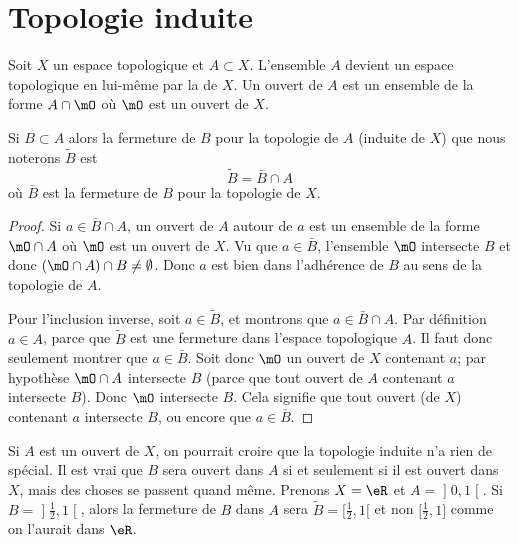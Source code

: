 \section{Topologie induite}

\begin{definition}  \label{DefVLrgWDB}
Soit \( X\) un espace topologique et \( A\subset X\). L'ensemble \( A\) devient un espace topologique en lui-même par la  de \( X\). Un ouvert de \( A\) est un ensemble de la forme \( A\cap\mO\) où \( \mO\) est un ouvert de \( X\).
\end{definition}

\begin{lemma}       \label{LemkUYkQt}
    Si \( B\subset A\) alors la fermeture de \( B\) pour la topologie de \( A\) (induite de \( X\)) que nous noterons \( \tilde B\) est 
    \begin{equation}
        \tilde B=\bar B\cap A
    \end{equation}
    où \( \bar B\) est la fermeture de \( B\) pour la topologie de \( X\).
\end{lemma}

\begin{proof}
    Si \( a\in \bar B\cap A\), un ouvert de \( A\) autour de \( a\) est un ensemble de la forme \( \mO\cap A\) où \( \mO\) est un ouvert de \( X\). Vu que \( a\in\bar B\), l'ensemble \( \mO\) intersecte \( B\) et donc \( (\mO\cap A)\cap B\neq \emptyset\). Donc \( a\) est bien dans l'adhérence de \( B\) au sens de la topologie de \( A\).

    Pour l'inclusion inverse, soit \( a\in \tilde  B\), et montrons que \( a\in \bar B\cap A\). Par définition \( a\in A\), parce que \( \tilde B\) est une fermeture dans l'espace topologique \( A\). Il faut donc seulement montrer que \( a\in\bar B\). Soit donc \( \mO\) un ouvert de \( X\) contenant \( a\); par hypothèse \( \mO\cap A\) intersecte \( B\) (parce que tout ouvert de \( A\) contenant \( a\) intersecte \( B\)). Donc \( \mO\) intersecte \( B\). Cela signifie que tout ouvert (de \( X\)) contenant \( a\) intersecte \( B\), ou encore que \( a\in \bar B\).
\end{proof}

\begin{example} \label{ExloeyoR}
    Si \( A\) est un ouvert de \( X\), on pourrait croire que la topologie induite n'a rien de spécial. Il est vrai que \( B\) sera ouvert dans \( A\) si et seulement si il est ouvert dans \( X\), mais des choses se passent quand même. Prenons \( X=\eR\) et \( A=\mathopen] 0 , 1 \mathclose[\). Si \( B=\mathopen] \frac{ 1 }{2} , 1 \mathclose[ \), alors la fermeture de \( B\) dans \( A\) sera \( \tilde B=\mathopen[ \frac{ 1 }{2} , 1 [\) et non \( \mathopen[ \frac{ 1 }{2} , 1 \mathclose]\) comme on l'aurait dans \( \eR\).
\end{example}

